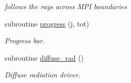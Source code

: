 \begin{DoxyCompactItemize}
\begin{DoxyCompactList}\small\item\em follows the rays across M\+P\+I boundaries \end{DoxyCompactList}\item 
subroutine \hyperlink{namespacedifrad_a17151a5334db41fd14315d454e883b8e}{progress} (j, tot)
\begin{DoxyCompactList}\small\item\em Progress bar. \end{DoxyCompactList}\item 
subroutine \hyperlink{namespacedifrad_aeec1cd3dae50e6946aadb42abef934ec}{diffuse\+\_\+rad} ()
\begin{DoxyCompactList}\small\item\em Diffuse radiation driver. \end{DoxyCompactList}\end{DoxyCompactItemize}
